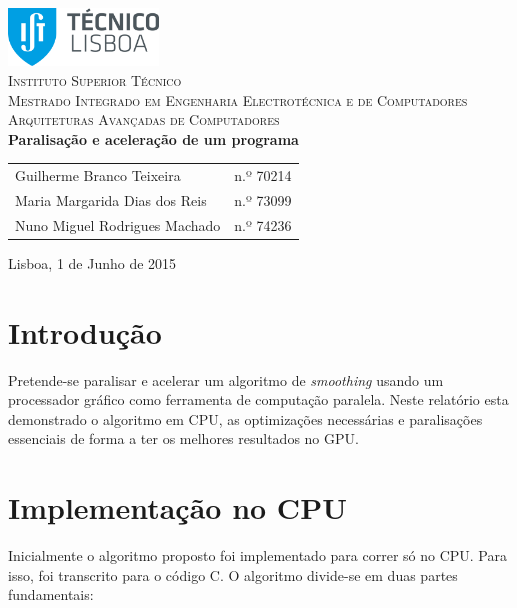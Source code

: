 \documentclass[11pt]{article}
\numberwithin{equation}{section}
\begin{document}
\begin{titlepage}
\begin{center}

\hfill \break
\hfill \break

\includegraphics[width=0.3\textwidth]{./logo}~\\[1cm]

\textsc{\LARGE Instituto Superior Técnico}\\[0.25cm]
\textsc{\Large Mestrado Integrado em Engenharia Electrotécnica e de Computadores}\\[1.8cm]
\textsc{\huge Arquiteturas Avançadas de Computadores}\\[0.25cm]

{\huge \bfseries Paralisação e aceleração de um programa\\[2cm]}

\begin{tabular}{ l l }
Guilherme Branco Teixeira & \hspace{2mm} n.º 70214\\
Maria Margarida Dias dos Reis & \hspace{2mm} n.º 73099 \\
Nuno Miguel Rodrigues Machado & \hspace{2mm} n.º 74236
\end{tabular}

\vfill

{\large Lisboa, 1 de Junho de 2015} 

\end{center}
\end{titlepage}

\clearpage

\tableofcontents
\pagebreak

\clearpage
{}

\section{Introdução}
Pretende-se paralisar e acelerar um algoritmo de \textit{smoothing} usando um processador gráfico como ferramenta de computação paralela. Neste relatório esta demonstrado o algoritmo em CPU, as optimizações necessárias e paralisações essenciais de forma a ter os melhores resultados no GPU.
\section{Implementação no CPU }
Inicialmente o algoritmo proposto foi implementado para correr só no CPU. Para isso, foi transcrito para o código C.
O algoritmo divide-se em duas partes fundamentais:
\end{document}
